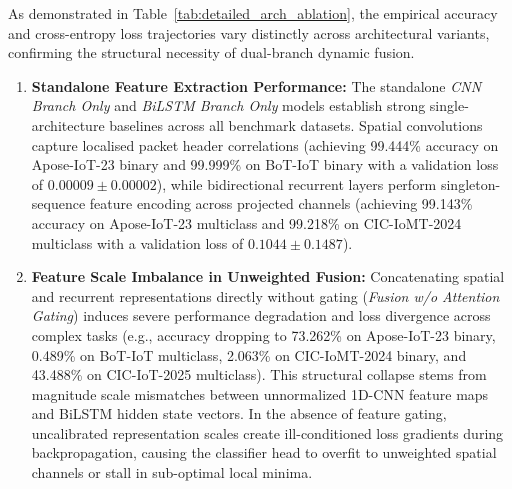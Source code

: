 \documentclass[a4paper,fleqn]{cas-sc}
\begin{document}
As demonstrated in Table~\ref{tab:detailed_arch_ablation}, the empirical accuracy and cross-entropy loss trajectories vary distinctly across architectural variants, confirming the structural necessity of dual-branch dynamic fusion.

\begin{enumerate}
    \item \textbf{Standalone Feature Extraction Performance:} The standalone \textit{CNN Branch Only} and \textit{BiLSTM Branch Only} models establish strong single-architecture baselines across all benchmark datasets. Spatial convolutions capture localised packet header correlations (achieving 99.444\% accuracy on Apose-IoT-23 binary and 99.999\% on BoT-IoT binary with a validation loss of $0.00009 \pm 0.00002$), while bidirectional recurrent layers perform singleton-sequence feature encoding across projected channels (achieving 99.143\% accuracy on Apose-IoT-23 multiclass and 99.218\% on CIC-IoMT-2024 multiclass with a validation loss of $0.1044 \pm 0.1487$).
    
    \item \textbf{Feature Scale Imbalance in Unweighted Fusion:} Concatenating spatial and recurrent representations directly without gating (\textit{Fusion w/o Attention Gating}) induces severe performance degradation and loss divergence across complex tasks (e.g., accuracy dropping to 73.262\% on Apose-IoT-23 binary, 0.489\% on BoT-IoT multiclass, 2.063\% on CIC-IoMT-2024 binary, and 43.488\% on CIC-IoT-2025 multiclass). This structural collapse stems from magnitude scale mismatches between unnormalized 1D-CNN feature maps and BiLSTM hidden state vectors. In the absence of feature gating, uncalibrated representation scales create ill-conditioned loss gradients during backpropagation, causing the classifier head to overfit to unweighted spatial channels or stall in sub-optimal local minima.
    

\end{enumerate}
\end{document}
